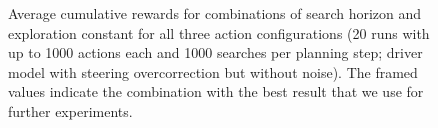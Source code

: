 \begin{figure}[htbp]
    \caption[Average cumulative rewards for combinations of search horizon and exploration constant]{Average cumulative rewards for combinations of search horizon and exploration constant for all three action configurations (20 runs with up to 1000 actions each and 1000 searches per planning step; driver model with steering overcorrection but without noise). The framed values indicate the combination with the best result that we use for further experiments.}
\end{figure}